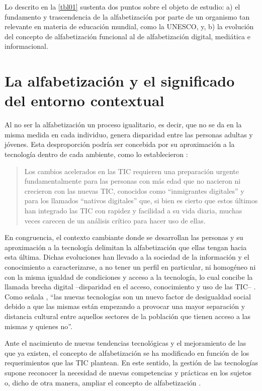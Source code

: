 \documentclass[spanish]{textolivre}
\begin{document}
Lo descrito en la \cref{tbl01} sustenta dos puntos sobre el objeto de estudio: a) el fundamento y trascendencia de la alfabetización por parte de un organismo tan relevante en materia de educación mundial, como la UNESCO, y, b) la evolución del concepto de alfabetización funcional al de alfabetización digital, mediática e informacional.

\section{La alfabetización y el significado del entorno contextual}\label{sec-conceito}
Al no ser la alfabetización un proceso igualitario, es decir, que no se da en la misma medida en cada individuo, genera disparidad entre las personas adultas y jóvenes. Esta desproporción podría ser concebida por su aproximación a la tecnología dentro de cada ambiente, como lo establecieron \textcite[p. 451]{avello__martinez_evolucion_2015}:

\begin{quote}
    Los cambios acelerados en las TIC requieren una preparación urgente fundamentalmente para las personas con más edad que no nacieron ni crecieron con las nuevas TIC, conocidos como “inmigrantes digitales” y para los llamados “nativos digitales” que, si bien es cierto que estos últimos han integrado las TIC con rapidez y facilidad a su vida diaria, muchas veces carecen de un análisis crítico para hacer uso de ellas.
\end{quote}

En congruencia, el contexto cambiante donde se desarrollan las personas y su aproximación a la tecnología delimitan la alfabetización que ellas tengan hacia esta última. Dichas evoluciones han llevado a la sociedad de la información y el conocimiento a caracterizarse, a no tener un perfil en particular, ni homogéneo ni con la misma igualdad de condiciones y acceso a la tecnología, lo cual concibe la llamada brecha digital –disparidad en el acceso, conocimiento y uso de las TIC– \cite{uribe_tirado_acceso_2004}. Como señala \textcite[p. 57]{area_moreira_alfabetizacion_2014}, “las nuevas tecnologías son un nuevo factor de desigualdad social debido a que las mismas están empezando a provocar una mayor separación y distancia cultural entre aquellos sectores de la población que tienen acceso a las mismas y quienes no”. 

Ante el nacimiento de nuevas tendencias tecnológicas y el mejoramiento de las que ya existen, el concepto de alfabetización se ha modificado en función de los requerimientos que las TIC plantean. En este sentido, la gestión de las tecnologías supone reconocer la necesidad de nuevas competencias y prácticas en los sujetos o, dicho de otra manera, ampliar el concepto de alfabetización \cite{ruiz_requies_formar_2010}.
\end{document}

